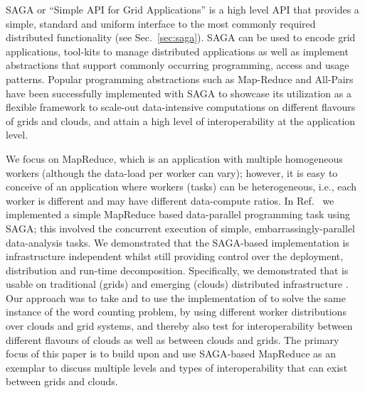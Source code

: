 \documentclass[3p,twocolumn]{elsarticle}
\begin{document}


SAGA or “Simple API for Grid Applications” is a high level API that
provides a simple, standard and uniform interface to the most commonly
required distributed functionality (see Sec.~\ref{sec:saga}). SAGA can
be used to encode grid applications, tool-kits to manage distributed
applications as well as implement abstractions that support commonly
occurring programming, access and usage patterns. Popular programming
abstractions such as Map-Reduce and All-Pairs have been successfully
implemented with SAGA to showcase its utilization as a flexible
framework to scale-out data-intensive computations on different flavours
of grids and clouds, and attain a high level of interoperability at the
application level. 
 
We focus on MapReduce, which is an application with multiple homogeneous
workers (although the data-load per worker can vary); however, it is
easy to conceive of an application where workers (tasks) can be
heterogeneous, i.e., each worker is different and may have different
data-compute ratios.  In Ref.~\cite{saga_ccgrid09} we implemented
a simple MapReduce based data-parallel programming task using SAGA; this
involved the concurrent execution of simple, embarrassingly-parallel
data-analysis tasks.  We demonstrated that the SAGA-based implementation
is infrastructure independent whilst still providing control over the
deployment, distribution and run-time decomposition.  Specifically, we
demonstrated that \sagamapreduce is usable on traditional (grids) and
emerging (clouds) distributed infrastructure .  Our
approach was to take \sagamapreduce and to use the 
implementation of \sagamapreduce to solve the same instance of the word
counting problem, by using different worker distributions over clouds
and grid systems, and thereby also test for interoperability between
different flavours of clouds as well as between clouds and grids.  The
primary focus of this paper is to build upon and use SAGA-based
MapReduce as an exemplar to discuss multiple levels and types of
interoperability that can exist between grids and clouds. 
\end{document}
